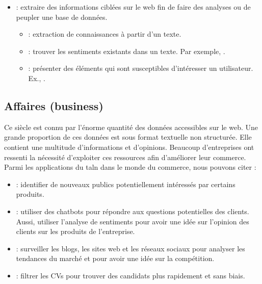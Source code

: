 \documentclass{KodeBook}
\begin{document}
\begin{itemize}
	\item {} : extraire des informations ciblées sur le web fin de faire des analyses ou de peupler une base de données.
	\begin{itemize}
		\item {} : extraction de connaissances à partir d'un texte.
		\item {} : trouver les sentiments existants dans un texte. Par exemple, .
		\item {} : présenter des éléments qui sont susceptibles d'intéresser un utilisateur. Ex., .
	\end{itemize}
\end{itemize}


\subsection{Affaires (business)}

Ce siècle est connu par l'énorme quantité des données accessibles sur le web. 
Une grande proportion de ces données est sous format textuelle non structurée.
Elle contient une multitude d'informations et d'opinions. 
Beaucoup d'entreprises ont ressenti la nécessité d'exploiter ces ressources afin d'améliorer leur commerce. 
Parmi les applications du \ac{taln} dans le monde du commerce, nous pouvons citer :
\begin{itemize}
	\item {} : identifier de nouveaux publics potentiellement intéressés par certains produits.
	\item {} : utiliser des chatbots pour répondre aux questions potentielles des clients. Aussi, utiliser l'analyse de sentiments pour avoir une idée sur l'opinion des clients sur les produits de l'entreprise.
	\item {} : surveiller les blogs, les sites web et les réseaux sociaux pour analyser les tendances du marché et pour avoir une idée sur la compétition.
	\item {} : filtrer les CVs pour trouver des candidats plus rapidement et sans biais.
\end{itemize}
\end{document}
